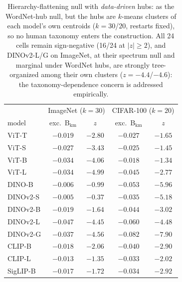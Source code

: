 \begin{table}[H]
\centering
\small
\setlength{\tabcolsep}{5pt}
\begin{tabular}{lcc|cc}
\toprule
& \multicolumn{2}{c|}{ImageNet ($k{=}30$)} & \multicolumn{2}{c}{CIFAR-100 ($k{=}20$)} \\
model & exc.\ B$_{\text{km}}$ & $z$ & exc.\ B$_{\text{km}}$ & $z$ \\
\midrule
ViT-T & $-0.019$ & $-2.80$ & $-0.027$ & $-1.65$ \\
ViT-S & $-0.027$ & $-3.43$ & $-0.025$ & $-1.45$ \\
ViT-B & $-0.034$ & $-4.06$ & $-0.018$ & $-1.34$ \\
ViT-L & $-0.034$ & $-4.99$ & $-0.045$ & $-2.77$ \\
\midrule
DINO-B & $-0.006$ & $-0.99$ & $-0.053$ & $-5.96$ \\
DINOv2-S & $-0.005$ & $-0.37$ & $-0.035$ & $-5.18$ \\
DINOv2-B & $-0.019$ & $-1.64$ & $-0.044$ & $-3.02$ \\
DINOv2-L & $-0.047$ & $-4.45$ & $-0.060$ & $-4.48$ \\
DINOv2-G & $-0.037$ & $-4.56$ & $-0.082$ & $-7.90$ \\
\midrule
CLIP-B & $-0.018$ & $-2.06$ & $-0.040$ & $-2.90$ \\
CLIP-L & $-0.013$ & $-1.35$ & $-0.033$ & $-2.02$ \\
SigLIP-B & $-0.017$ & $-1.72$ & $-0.034$ & $-2.92$ \\
\bottomrule
\end{tabular}
\caption{Hierarchy-flattening null with \emph{data-driven} hubs: as the WordNet-hub null, but the hubs are $k$-means clusters of each model's own centroids ($k{=}30$/$20$, restarts fixed), so no human taxonomy enters the construction. All 24 cells remain sign-negative (16/24 at $|z|\ge2$), and DINOv2-L/G on ImageNet, at their spectrum null and marginal under WordNet hubs, are strongly tree-organized among their own clusters ($z=-4.4$/$-4.6$): the taxonomy-dependence concern is addressed empirically.}
\label{tab:b16-kmhubs}
\end{table}
